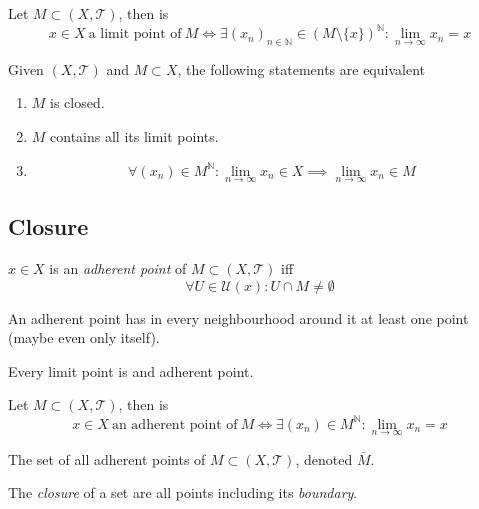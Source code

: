 \begin{proposition}
   Let \(M \subset (X, \mathcal{T})\), then is
   \[x \in X~\text{a limit point of}~M \iff \exists (x_n)_{n \in \mathbb{N}} \in (M\setminus\{x\})^\mathbb{N}: \lim_{n \to \infty} x_n = x\]
\end{proposition}

\begin{theorem}
   Given \((X, \mathcal{T})\) and \(M \subset X\), the following statements are equivalent
   \begin{enumerate}[label=\roman*, align=Center]
      \item \(M\) is closed.
      \item \(M\) contains all its limit points.
      \item \[\forall (x_n) \in M^\mathbb{N}: \lim_{n \to \infty} x_n \in X \implies \lim_{n \to \infty} x_n \in M\]
   \end{enumerate}
\end{theorem}

\subsection{Closure}
\begin{definition}
   \(x \in X\) is an \emph{adherent point} of \(M \subset (X, \mathcal{T})\) iff
   \[\forall U \in \mathcal{U}(x): U \cap M \neq \emptyset\]
\end{definition}
\begin{remark}[Intuition]
   An adherent point has in every neighbourhood around it at least one point (maybe even only itself).
\end{remark}
\begin{remark}
   Every limit point is and adherent point.
\end{remark}

\begin{proposition}
   Let \(M \subset (X, \mathcal{T})\), then is
   \[x \in X~\text{an adherent point of}~M \iff \exists (x_n) \in M^\mathbb{N}: \lim_{n \to \infty} x_n = x\]
\end{proposition}

\begin{definition}
   The set of all adherent points of \(M \subset (X, \mathcal{T})\), denoted \(\overline{M}\).
\end{definition}
\begin{remark}[Intuition]
   The \emph{closure} of a set are all points including its \emph{boundary}.
\end{remark}

